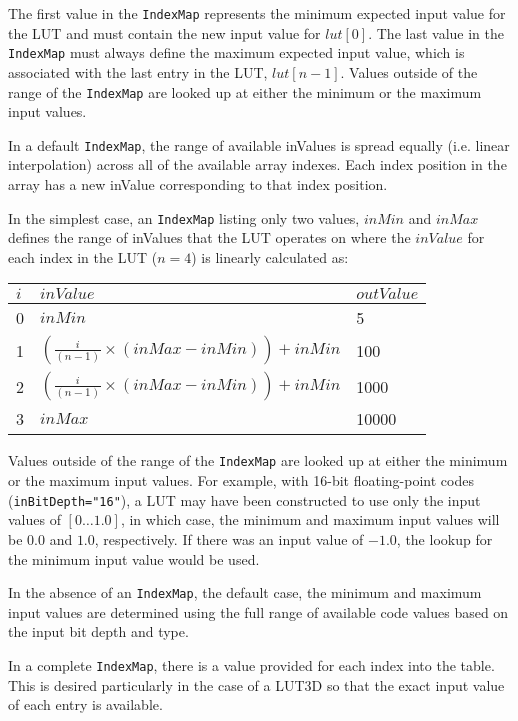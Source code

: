 The first value in the \texttt{IndexMap} represents the minimum expected input value for the LUT and must contain the new input value for $lut[0]$. The last value in the \texttt{IndexMap} must always define the maximum expected input value, which is associated with the last entry in the LUT, $lut[n-1]$.  Values outside of the range of the \texttt{IndexMap} are looked up at either the minimum or the maximum input values.

In a default \texttt{IndexMap}, the range of available inValues is spread equally (i.e. linear interpolation) across all of the available array indexes.  Each index position in the array has a new inValue corresponding to that index position. 

In the simplest case, an \texttt{IndexMap} listing only two values, $inMin$ and $inMax$ defines the range of inValues that the LUT operates on where the $inValue$  for each index in the LUT ($n=4$) is linearly calculated as:

\begin{center}
\begin{tabularx}{3.5in}{|l|X|l|}
\hline
$i$ & $inValue$ & $outValue$ \\\hline
0 & $inMin$	& 5 \\\hline
1 & $\left(\frac{i}{(n-1)}\times(inMax-inMin)\right)+inMin$	& 100 \\\hline
2 & $\left(\frac{i}{(n-1)}\times(inMax-inMin)\right)+inMin$	& 1000 \\\hline
3 & $inMax$ & 10000 \\\hline
\end{tabularx}
\end{center}

Values outside of the range of the \texttt{IndexMap} are looked up at either the minimum or the maximum input values. For example, with 16-bit floating-point codes (\texttt{inBitDepth="16"}), a LUT may have been constructed to use only the input values of $[0 \ldots 1.0]$, in which case, the minimum and maximum input values will be $0.0$ and $1.0$, respectively. If there was an input value of $-1.0$, the lookup for the minimum input value would be used.

In the absence of an \texttt{IndexMap}, the default case, the minimum and maximum input values are determined using the full range of available code values based on the input bit depth and type.

In a complete \texttt{IndexMap}, there is a value provided for each index into the table. This is desired particularly in the case of a LUT3D so that the exact input value of each entry is available.  

